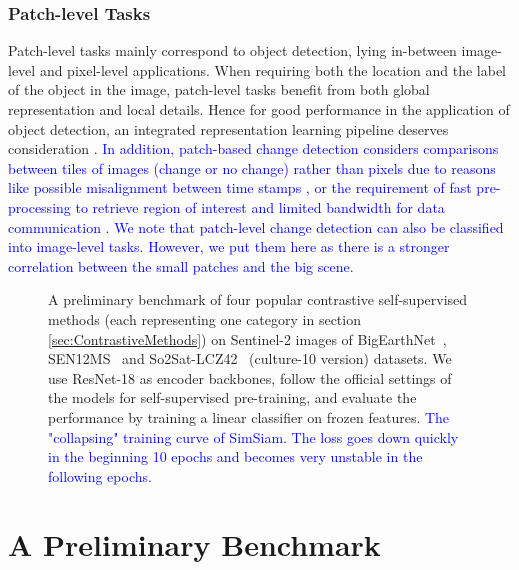 \documentclass[lettersize,journal]{IEEEtran}
\begin{document}
\subsubsection{Patch-level Tasks}

Patch-level tasks mainly correspond to object detection, lying in-between image-level and pixel-level applications. When requiring both the location and the label of the object in the image, patch-level tasks benefit from both global representation and local details. Hence for good performance in the application of object detection, an integrated representation learning pipeline deserves consideration  \cite{ding2021unsupervised}. \textcolor{blue}{In addition, patch-based change detection considers comparisons between tiles of images (change or no change) rather than pixels due to reasons like possible misalignment between time stamps \cite{saha2021patch}, or the requirement of fast pre-processing to retrieve region of interest and limited bandwidth for data communication \cite{ruuvzivcka2021unsupervised}. We note that patch-level change detection can also be classified into image-level tasks. However, we put them here as there is a stronger correlation between the small patches and the big scene.}








\begin{figure*}
\centering
{}
\caption[benchmark-SSL-RS]{ A preliminary benchmark of four popular contrastive self-supervised methods (each representing one category in section \ref{sec:ContrastiveMethods}) on Sentinel-2 images of BigEarthNet~\cite{sumbul2019bigearthnet}, SEN12MS~\cite{schmitt2019sen12ms} 
and So2Sat-LCZ42~\cite{zhu2019so2sat} (culture-10 version) datasets. We use ResNet-18 as encoder backbones, follow the official settings of the models for self-supervised pre-training, and evaluate the performance by training a linear classifier on frozen features. 
\textcolor{blue}{
 The "collapsing" training curve of SimSiam. The loss goes down quickly in the beginning 10 epochs and becomes very unstable in the following epochs.
}
}
\label{fig:ssl-benchmark}
\end{figure*}


\color{blue}
\section{A Preliminary Benchmark}
\end{document}
